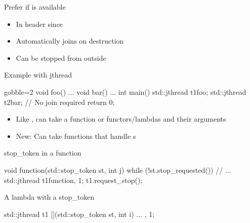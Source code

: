 \begin{frame}[fragile]
  \begin{goodpractice}{Prefer  if  is available}
    \begin{itemize}
    \item In  header since 
    \item Automatically joins on destruction
    \item Can be stopped from outside
    \end{itemize}
  \end{goodpractice}

  \begin{exampleblock}{Example with jthread}
    \begin{cppcode*}{gobble=2}
      void foo() {...}
      void bar() {...}
      int main() {
        std::jthread t1{foo};
        std::jthread t2{bar};
        // No join required
        return 0;
      }
    \end{cppcode*}
  \end{exampleblock}
\end{frame}

\begin{frame}[fragile]
  \begin{block}{}
    \begin{itemize}
      \item Like ,  can take a function or functors/lambdas and their arguments
      \item New: Can take functions that handle s
    \end{itemize}
  \end{block}
  \begin{exampleblock}{stop\_token in a function}
    \begin{cppcode*}{}
    void function(std::stop_token st, int j) {
      while (!st.stop_requested()) {
        // ...
    }}
    std::jthread t1{function, 1};
    t1.request_stop();
    \end{cppcode*}
  \end{exampleblock}
  \begin{exampleblock}{A lambda with a stop\_token}
    \begin{cppcode*}{}
    std::jthread t1{
      [](std::stop_token st, int i){ ... }, 1};
    \end{cppcode*}
  \end{exampleblock}
\end{frame}


